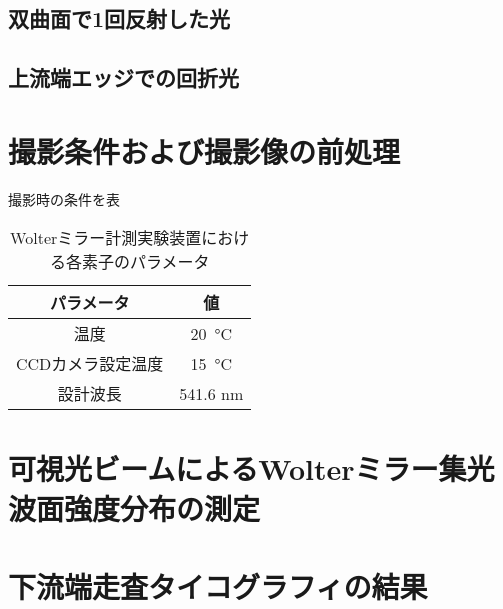 \subsection{双曲面で1回反射した光}


\subsection{上流端エッジでの回折光}
\label{chap5_}

\clearpage
\newpage

\section{撮影条件および撮影像の前処理}

撮影時の条件を表

\begin{table}[!ht]
\begin{center}
  \begin{tabular}{|c|c|} \hline
    パラメータ & 値 \\ \hline
    温度 & \SI{20}{\degreeCelsius}  \\
    CCDカメラ設定温度 & \SI{15}{\degreeCelsius} \\
    設計波長 & 541.6 nm \\ \hline
  \end{tabular}
  \caption{Wolterミラー計測実験装置における各素子のパラメータ}
  \label{tb:mirror_experiment_params}
\end{center}
\end{table}


\clearpage
\newpage

\section{可視光ビームによるWolterミラー集光波面強度分布の測定}



\clearpage

\newpage

\section{下流端走査タイコグラフィの結果}

